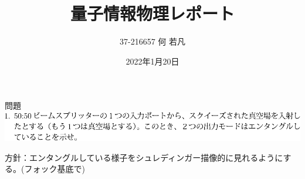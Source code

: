 \documentclass{jsarticle}
\begin{document}
\title{量子情報物理レポート}
\author{37-216657 何 若凡}
\date{2022年1月20日}
\maketitle


\begin{itembox}[l]{問題}
	\vspace*{-0mm}
	\centering
	\includegraphics[width=1\linewidth]{./graphics/1.pdf}

方針：エンタングルしている様子をシュレディンガー描像的に見れるようにする。(フォック基底で)
\end{itembox}
\end{document}
